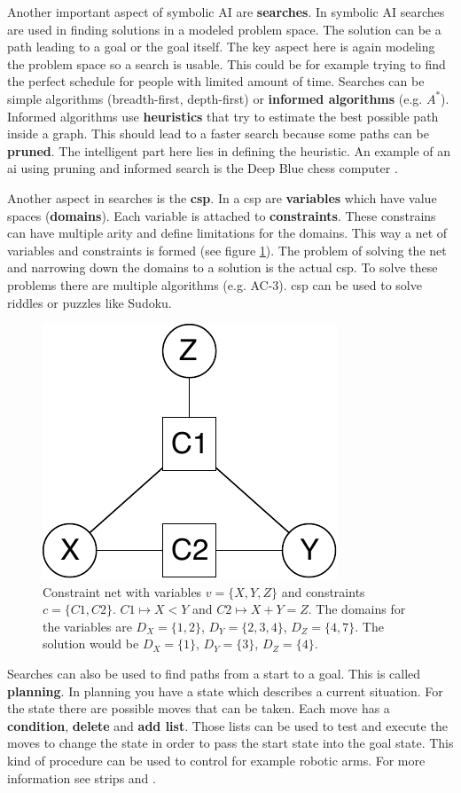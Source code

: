 \documentclass[jou,apacite]{apa6}
\begin{document}
Another important aspect of symbolic AI are \textbf{searches}. In symbolic AI searches are used in finding solutions in a modeled problem space. The solution can be a path leading to a goal or the goal itself. The key aspect here is again modeling the problem space so a search is usable. This could be for example trying to find the perfect schedule for people with limited amount of time. Searches can be simple algorithms (breadth-first, depth-first) or \textbf{informed algorithms} (e.g. $A^*$). Informed algorithms use \textbf{heuristics} that try to estimate the best possible path inside a graph. This should lead to a faster search because some paths can be \textbf{pruned}. The intelligent part here lies in defining the heuristic. An example of an \gls{ai} using pruning and informed search is the Deep Blue chess computer \cite{Campbell2002}.

Another aspect in searches is the \textbf{\gls{csp}}. In a \gls{csp} are \textbf{variables} which have value spaces (\textbf{domains}). Each variable is attached to \textbf{constraints}. These constrains can have multiple arity and define limitations for the domains. 
This way a net of variables and constraints is formed (see figure \ref{fig:cs-net}). The problem of solving the net and narrowing down the domains to a solution is the actual \gls{csp}. To solve these problems there are multiple algorithms (e.g. AC-3). \gls{csp} can be used to solve riddles or puzzles like Sudoku.

\begin{figure}[!htb]
\centering
	\includegraphics[width=.25\textwidth]{csp.pdf}
\caption[Constraint net]{Constraint net with variables $v = \{X,Y,Z\}$ and constraints $c = \{C1, C2\}$. $C1 \mapsto X < Y$ and $C2 \mapsto X + Y = Z$. The domains for the variables are $D_X = \{1,2\}$, $D_Y = \{2,3,4\}$, $D_Z = \{4,7\}$. The solution would be $D_X = \{1\}$, $D_Y = \{3\}$, $D_Z = \{4\}$.}
\label{fig:cs-net}
\end{figure}

Searches can also be used to find paths from a start to a goal. This is called \textbf{planning}. In planning you have a state which describes a current situation. For the state there are possible moves that can be taken. Each move has a \textbf{condition}, \textbf{delete} and \textbf{add list}. Those lists can be used to test and execute the moves to change the state in order to pass the start state into the goal state. This kind of procedure can be used to control for example robotic arms. For more information see \gls{strips} and \cite{Nilsson1982}.
\end{document}

